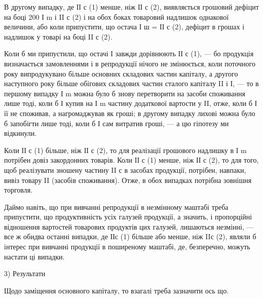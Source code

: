 В другому випадку, де ІІ с (1) менше, ніж ІІ с (2), виявляється грошовий
дефіцит на боці 200 І m і II с (2) і на обох боках товаровий надлишок
однакової величини, або коли припустити, що остача І ш = ІІ с (2), дефіцит
в грошах і надлишок у товарі на боці II с (2).

Коли б ми припустили, що остачі І завжди дорівнюють ІІ с (1), — бо
продукція визначається замовленнями і в репродукції нічого не змінюється,
коли поточного року випродукувано більше основних складових частин
капіталу, а другого наступного року більше обігових складових частин
сталого капіталу II і І, — то в першому випадку І m можна було б знову
перетворити на засоби споживання лише тоді, коли б І купив на І m
частину додаткової вартости у II, отже, коли б І її не споживав, а нагромаджував
як гроші; в другому випадку лихові можна було б запобігти
лише тоді, коли б І сам витратив гроші, — а цю гіпотезу ми
відкинули.

Коли ІІ с (1) більше, ніж ІІ с (2), то для реалізації грошового надлишку
в І m потрібен довіз закордонних товарів. Коли ІІ с (1) менше, ніж ІІ с
(2), то для того, щоб реалізувати зношену частину II с в засобах продукції,
потрібен, навпаки, вивіз товару II (засобів споживання). Отже, в
обох випадках потрібна зовнішня торговля.

Даймо навіть, що при вивчанні репродукції в незмінному маштабі
треба припустити, що продуктивність усіх галузей продукції, а значить,
і пропорційні відношення вартостей товарових продуктів цих галузей,
лишаються незмінні, — все ж обидва останні випадки, де ІІс (1) більше
або менше, ніж IIс (2), являли б інтерес при вивчанні продукції в поширеному
маштабі, де, безперечно, можуть настати ці випадки.

3) Результати

Щодо заміщення основного капіталу, то взагалі треба зазначити ось що.

